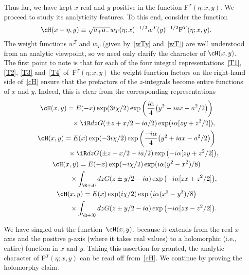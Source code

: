 \documentclass[pdftex]{sigma}
\numberwithin{equation}{section}
\begin{document}
Thus far, we have kept $x$ real and $y$ positive in the function F$^T(\eta;x,y)$. We proceed to study its analyticity features. To this end, consider the function
\begin{gather}\label{cH}
\cH(x-\eta,y)\equiv \sqrt{a_+a_-}w_T(\eta;x)^{-1/2}w^T(y)^{-1/2}{\rm F
}^T(\eta;x,y).
\end{gather}
The weight functions $w^T$ and $w_T$ (given by~\eqref{wTy} and~\eqref{wT}) are well understood from an analytic viewpoint, so we need only clarify the character of $\cH(x,y)$. The f\/irst point to note is that for each of the four integral representations~\eqref{T1}, \eqref{T2}, \eqref{T3} and~\eqref{T4} of~F$^T(\eta;x,y)$ the weight function factors on the right-hand side of~\eqref{cH} ensure that the prefactors of the $z$-integrals become entire functions of $x$ and $y$. Indeed, this is clear from the corresponding representations
\begin{gather}
\cH(x,y)     =    E(-x)\exp(3i\chi/2)\exp\left( \frac{i\alpha}{4}\big(y^2-iax-a^2/2\big)\right)
\nonumber \\
\phantom{\cH(x,y)     =}{}   \times \iR dz G(\pm z +x/2-ia/2)
 \exp (i\alpha[zy+z^2/2]),\label{cH1}
\\
\cH(x,y)    =   E(x) \exp(-3i\chi/2)\exp\left( \frac{-i\alpha}{4}\big(y^2+iax-a^2/2\big)\right)
\nonumber \\
\phantom{\cH(x,y)    =}{}  \times \iR dz G(\pm z -x/2-ia/2) \exp \big({-}i\alpha[zy+z^2/2]\big),\label{cH2}
\\
\cH(x,y)     =    E(-x)\exp(-i\chi/2)\exp(i\alpha (y^2-x^2)/8)
\nonumber \\
\phantom{\cH(x,y)     =}{}  \times \int_{\R +i0} dzG(z\pm y/2-ia)\exp\big({-}i\alpha[zx+z^2/2]\big),\label{cH3}
\\
\cH(x,y)    =   E(x)\exp(i\chi/2)\exp\big(i\alpha (x^2- y^2)/8\big)
\nonumber \\
\phantom{\cH(x,y)    =}{}  \times \int_{\R +i0} dzG(z\pm y/2-ia)\exp\big({-}i\alpha[zx-z^2/2]\big).\label{cH4}
\end{gather}

We have singled out the function~$\cH(x,y)$, because it extends from the real $x$-axis and the positive $y$-axis (where it takes real values) to a holomorphic (i.e., entire) function in $x$ and $y$. Taking this assertion for granted, the analytic character of F$^T(\eta;x,y)$ can be read of\/f from~\eqref{cH}. We continue by proving the holomorphy claim.
\end{document}
